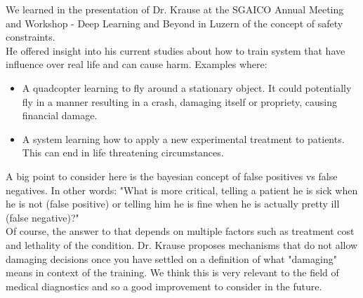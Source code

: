 We learned in the presentation of Dr. Krause at the SGAICO Annual Meeting and Workshop - Deep Learning and Beyond in Luzern of the concept of safety constraints. \\
He offered insight into his current studies about how to train system that have influence over real life and can cause harm. Examples where:
\begin{itemize}
	\item{A quadcopter learning to fly around a stationary object. It could potentially fly in a manner resulting in a crash, damaging itself or propriety, causing financial damage.}
	\item{A system learning how to apply a new experimental treatment to patients. This can end in life threatening circumstances.}
\end{itemize} 

A big point to consider here is the bayesian concept of false positives vs false negatives. In other words: "What is more critical, telling a patient he is sick when he is not (false positive) or telling him he is fine when he is actually pretty ill (false negative)?"\\
Of course, the answer to that depends on multiple factors such as treatment cost and lethality of the condition. Dr. Krause proposes mechanisms that do not allow damaging decisions once you have settled on a definition of what "damaging" means in context of the training.
We think this is very relevant to the field of medical diagnostics and so a good improvement to consider in the future.
